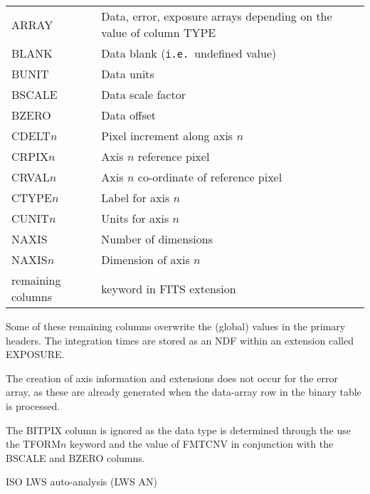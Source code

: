 {{{{            \begin{tabular}{lp{100mm}}
            ARRAY              &   Data, error, exposure arrays depending
                                   on the value of column TYPE \\
            BLANK              &   Data blank ({\tt{i.e.}}\ undefined value) \\
            BUNIT              &   Data units \\
            BSCALE             &   Data scale factor \\
            BZERO              &   Data offset \\
            CDELT$n$           &   Pixel increment along axis $n$ \\
            CRPIX$n$           &   Axis $n$ reference pixel \\
            CRVAL$n$           &   Axis $n$ co-ordinate of reference pixel \\
            CTYPE$n$           &   Label for axis $n$ \\
            CUNIT$n$           &   Units for axis $n$ \\
            NAXIS              &   Number of dimensions \\
            NAXIS$n$           &   Dimension of axis $n$ \\
            remaining columns  &   keyword in FITS extension \\
            \end{tabular}
            \medskip

            Some of these remaining columns overwrite the (global) values
            in the primary headers.  The integration times are stored as
            an NDF within an extension called EXPOSURE.
            \medskip

            The creation of axis information and extensions does not occur
            for the error array, as these are already generated when the
            data-array row in the binary table is processed.
            \medskip

            The BITPIX column is ignored as the data type is determined
            through the use the TFORM$n$ keyword and the value of FMTCNV in
            conjunction with the BSCALE and BZERO columns.
         }
         \bigskip

         \sstitem
         ISO LWS auto-analysis (LWS AN)

         }}}
